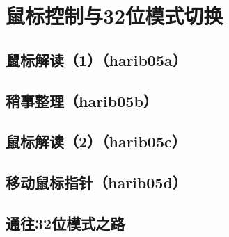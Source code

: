 ﻿\chapter{	鼠标控制与32位模式切换	}
\section{	鼠标解读（1）（harib05a）	}
\section{	稍事整理（harib05b）	}
\section{	鼠标解读（2）（harib05c）	}
\section{	移动鼠标指针（harib05d）	}
\section{	通往32位模式之路	}

